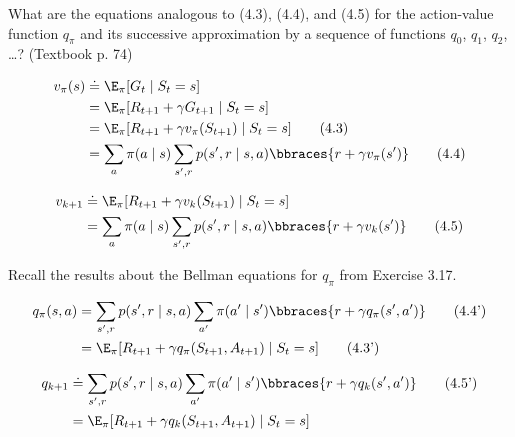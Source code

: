
\begin{exercise}[Exercise 4.3]

What are the equations analogous to (4.3), (4.4), and (4.5) for the action-value function $q_\pi$ and its successive approximation by a sequence of functions $q_0$, $q_1$, $q_2$, \dots?
(Textbook p. 74)

\begin{align*} %
    v_\pi(s)
    & \doteq
    \E_\pi[G_t \mid S_t = s] \\
    & =
    \E_\pi[R_{t+1} + \gamma G_{t+1} \mid S_t = s] \\
    & =
    \E_\pi[R_{t+1} + \gamma v_\pi(S_{t+1}) \mid S_t = s] \tag{4.3} \\
    & =
    \sum_a
        \pi(a \mid s)
        \sum_{s^\prime, r}
            p(s^\prime, r \mid s, a)
            \bbraces{r + \gamma v_\pi(s^\prime)} \tag{4.4}
\end{align*}

\begin{align*}
    v_{k+1}
    & \doteq
    \E_\pi[R_{t+1} + \gamma v_k(S_{t+1}) \mid S_t = s] \\
    & =
    \sum_a
        \pi(a \mid s)
        \sum_{s^\prime, r}
            p(s^\prime, r \mid s, a)
            \bbraces{r + \gamma v_k(s^\prime)} \tag{4.5}
\end{align*}

\end{exercise}


\begin{solution}

Recall the results about the Bellman equations for $q_\pi$ from Exercise 3.17.

\begin{align*}
    q_\pi(s, a)
    & =
    \sum_{s^\prime, r}
        p(s^\prime, r \mid s, a)
        \sum_{a^\prime}
            \pi(a^\prime \mid s^\prime)
            \bbraces{r + \gamma q_\pi(s^\prime, a^\prime)} \tag{4.4'} \\
    & =
    \E_\pi[R_{t+1} + \gamma q_\pi(S_{t+1}, A_{t+1}) \mid S_t = s] \tag{4.3'}
\end{align*}

\begin{align*}
    q_{k+1}
    & \doteq
    \sum_{s^\prime, r}
        p(s^\prime, r \mid s, a)
        \sum_{a^\prime}
            \pi(a^\prime \mid s^\prime)
            \bbraces{r + \gamma q_k(s^\prime, a^\prime)} \tag{4.5'} \\
    & =
    \E_\pi[R_{t+1} + \gamma q_k(S_{t+1}, A_{t+1}) \mid S_t = s]
\end{align*}

\end{solution}

